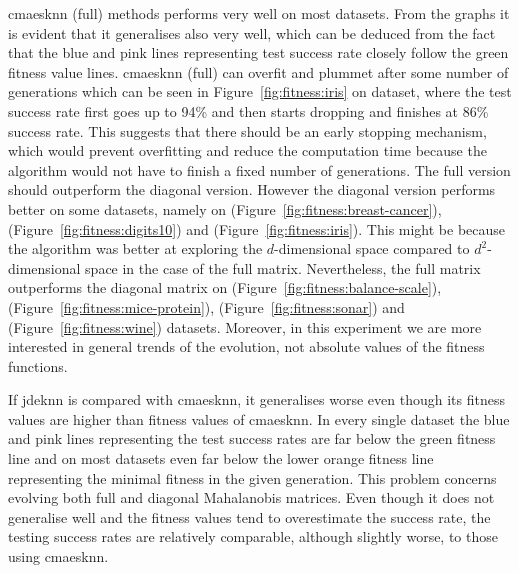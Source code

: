\documentclass[12pt,a4paper]{report}
\begin{document}
\ac{cmaesknn} (full) methods performs very well on most datasets. From the graphs it is evident that it generalises also very well, which can be deduced from the fact that the blue and pink lines representing test success rate closely follow the green fitness value lines. \ac{cmaesknn} (full) can overfit and plummet after some number of generations which can be seen in Figure~\ref{fig:fitness:iris} on  dataset, where the test success rate first goes up to 94\% and then starts dropping and finishes at 86\% success rate. This suggests that there should be an early stopping mechanism, which would prevent overfitting and reduce the computation time because the algorithm would not have to finish a fixed number of generations. The full version should outperform the diagonal version. However the diagonal version performs better on some datasets, namely on  (Figure~\ref{fig:fitness:breast-cancer}),  (Figure~\ref{fig:fitness:digits10}) and  (Figure~\ref{fig:fitness:iris}). This might be because the algorithm was better at exploring the $d$-dimensional space compared to $d^2$-dimensional space in the case of the full matrix. Nevertheless, the full matrix outperforms the diagonal matrix on  (Figure~\ref{fig:fitness:balance-scale}),  (Figure~\ref{fig:fitness:mice-protein}),  (Figure~\ref{fig:fitness:sonar}) and  (Figure~\ref{fig:fitness:wine}) datasets. Moreover, in this experiment we are more interested in general trends of the evolution, not absolute values of the fitness functions.

If \ac{jdeknn} is compared with \ac{cmaesknn}, it generalises worse even though its fitness values are higher than fitness values of \ac{cmaesknn}. In every single dataset the blue and pink lines representing the test success rates are far below the green fitness line and on most datasets even far below the lower orange fitness line representing the minimal fitness in the given generation. This problem concerns evolving both full and diagonal Mahalanobis matrices. Even though it does not generalise well and the fitness values tend to overestimate the success rate, the testing success rates are relatively comparable, although slightly worse, to those using \ac{cmaesknn}.
\end{document}
